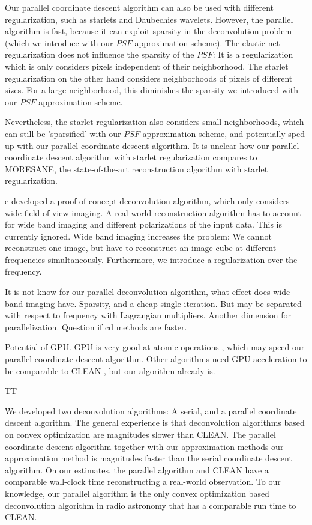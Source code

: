 Our parallel coordinate descent algorithm can also be used with different regularization, such as starlets and Daubechies wavelets. However, the parallel algorithm is fast, because it can exploit sparsity in the deconvolution problem (which we introduce with our $PSF$ approximation scheme). The elastic net regularization does not influence the sparsity of the $PSF$: It is a regularization which is only considers pixels independent of their neighborhood. The starlet regularization on the other hand considers neighborhoods of pixels of different sizes. For a large neighborhood, this diminishes the sparsity we introduced with our $PSF$ approximation scheme.  

Nevertheless, the starlet regularization also considers small neighborhoods, which can still be 'sparsified' with our $PSF$ approximation scheme, and potentially sped up with our parallel coordinate descent algorithm. It is unclear how our parallel coordinate descent algorithm with starlet regularization compares to MORESANE, the state-of-the-art reconstruction algorithm with starlet regularization.


e developed a proof-of-concept deconvolution algorithm, which only considers wide field-of-view imaging. A real-world reconstruction algorithm has to account for wide band imaging and different polarizations of the input data. This is currently ignored. Wide band imaging increases the problem: We cannot reconstruct one image, but have to reconstruct an image cube at different frequencies simultaneously. Furthermore, we introduce a regularization over the frequency.

It is not know for our parallel deconvolution algorithm, what effect does wide band imaging have. 
Sparsity, and a cheap single iteration.
But may be separated with respect to frequency with Lagrangian multipliers. Another dimension for parallelization. 
Question if cd methods are faster.


Potential of GPU. GPU is very good at atomic operations \cite{keplerShuffle}, which may speed our parallel coordinate descent algorithm. Other algorithms need GPU acceleration to be comparable to CLEAN \cite{dabbech2015moresane}, but our algorithm already is.


TT


We developed two deconvolution algorithms: A serial, and a parallel coordinate descent algorithm. The general experience is that deconvolution algorithms based on convex optimization are magnitudes slower than CLEAN\cite{offringa2017optimized}. The parallel coordinate descent algorithm together with our approximation methods our approximation method is magnitudes faster than the serial coordinate descent algorithm. On our estimates, the parallel algorithm and CLEAN have a comparable wall-clock time reconstructing a real-world observation. To our knowledge, our parallel algorithm is the only convex optimization based deconvolution algorithm in radio astronomy that has a comparable run time to CLEAN.

